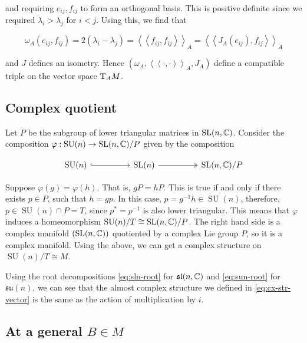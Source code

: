 \documentclass{article}
\DeclareMathOperator{\SU}{SU}
\newcommand{\su}{\mathfrak{su}}
\renewcommand{\sl}{\mathfrak{sl}}
\newcommand{\iinner}[1]{\left\langle\!\left\langle #1 \right\rangle\!\right\rangle}
\begin{document}
and requiring \(e_{ij}, f_{ij}\) to form an orthogonal basis. This is positive definite since we required \(\lambda_i > \lambda_j\) for \(i < j\). Using this, we find that

\[\omega_A(e_{ij}, f_{ij}) = 2(\lambda_i - \lambda_j) = \iinner{f_{ij}, f_{ij}}_A = \iinner{J_A(e_{ij}), f_{ij}}_A\]

and \(J\) defines an isometry. Hence \((\omega_A, \iinner{\cdot, \cdot}_A, J_A)\) define a compatible triple on the vector space \(\mathrm{T}_AM\).

\subsection{Complex quotient}

\label{sec:cx-quot}

Let \(P\) be the subgroup of lower triangular matrices in \(\operatorname{SL}(n, \mathbb{C})\). Consider the composition \(\varphi : \SU(n) \to \SL(n, \C)/P\) given by the composition 

\[\begin{tikzcd}
	{\SU(n)} && {\SL(n)} && {\SL(n, \C)/P}
	\arrow[hook, from=1-1, to=1-3]
	\arrow[two heads, from=1-3, to=1-5]
\end{tikzcd}\]

Suppose \(\varphi(g) = \varphi(h)\). That is, \(gP = hP\). This is true if and only if there exists \(p \in P\), such that \(h = gp\). In this case, \(p = g^{-1}h \in \SU(n)\), therefore, \(p \in \SU(n) \cap P = T\), since \(p^* = p^{-1}\) is also lower triangular. This means that \(\varphi\) induces a homeomorphism \(\SU(n)/T \cong \SL(n, \C)/P\). The right hand side is a complex manifold \((\operatorname{SL}(n, \mathbb{C}))\) quotiented by a complex Lie group \(P\), so it is a complex manifold. Using the above, we can get a complex structure on \(\SU(n)/T \cong M\).

Using the root decompositions \cref{eq:sln-root} for \(\sl(n, \C)\) and \cref{eq:sun-root} for \(\su(n)\), we can see that the almost complex structure we defined in \cref{eq:cx-str-vector} is the same as the action of multiplication by \(i\).

\subsection{At a general \(B \in M\)}
\end{document}
